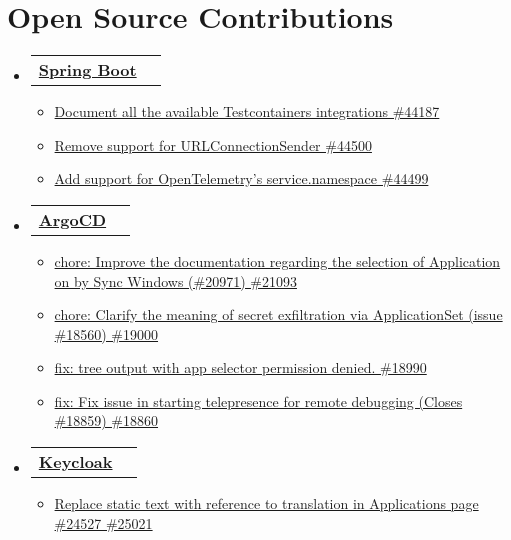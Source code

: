 \documentclass[a4paper,12pt]{article}
\makeatletter
\newcommand{\resumeItem}[1]{
	\item\small{
		{#1 \vspace{-2pt}}
	}
}
\newcommand{\resumeSubheadingSingleLine}[2]{
	\vspace{-2pt}\item
	\begin{tabular*}{0.97\textwidth}[t]{l@{\extracolsep{\fill}}r}
		\textbf{#1} & #2
	\end{tabular*}\vspace{-7pt}
}
\newcommand{\resumeSubHeadingListStart}{\begin{itemize}[leftmargin=0.15in, label={}]}
\newcommand{\resumeSubHeadingListEnd}{\end{itemize}}
\newcommand{\resumeItemListStart}{\begin{itemize}}
\newcommand{\resumeItemListEnd}{\end{itemize}\vspace{-5pt}}
\makeatother
\begin{document}
	\section{Open Source Contributions}
		\resumeSubHeadingListStart
			\resumeSubheadingSingleLine{ \href{https://github.com/spring-projects/spring-boot/pulls/thecooldrop}{Spring Boot}}{}{}{}
				\resumeItemListStart[label=]
					\resumeItem{\href{https://github.com/spring-projects/spring-boot/pull/44187}{Document all the available Testcontainers integrations \#44187}}
					\resumeItem{\href{https://github.com/spring-projects/spring-boot/pull/44500}{Remove support for URLConnectionSender \#44500}}
					\resumeItem{\href{https://github.com/spring-projects/spring-boot/pull/44499}{Add support for OpenTelemetry's service.namespace \#44499}}
				\resumeItemListEnd
			\resumeSubheadingSingleLine{ \href{https://github.com/argoproj/argo-cd/pulls/thecooldrop}{ArgoCD}}{}{}{}
				\resumeItemListStart[label=]
					\resumeItem{\href{https://github.com/argoproj/argo-cd/pull/21093}{chore: Improve the documentation regarding the selection of Application on by Sync Windows (\#20971) \#21093}}
					\resumeItem{\href{https://github.com/argoproj/argo-cd/pull/19000}{chore: Clarify the meaning of secret exfiltration via ApplicationSet (issue \#18560) \#19000}}
					\resumeItem{\href{https://github.com/argoproj/argo-cd/pull/18990}{fix: tree output with app selector permission denied. \#18990}}
					\resumeItem{\href{https://github.com/argoproj/argo-cd/pull/18860}{fix: Fix issue in starting telepresence for remote debugging (Closes \#18859) \#18860}}
				\resumeItemListEnd
			\resumeSubheadingSingleLine{ \href{https://github.com/keycloak/keycloak/pulls/thecooldrop}{Keycloak}}{}{}{}
				\resumeItemListStart[label=]
				\resumeItem{\href{https://github.com/keycloak/keycloak/pull/25021}{Replace static text with reference to translation in Applications page \#24527 \#25021}}
				\resumeItemListEnd
		\resumeSubHeadingListEnd
	
\end{document}
